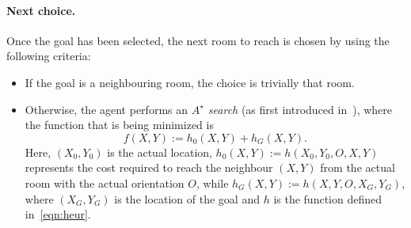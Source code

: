 \documentclass{llncs}
\begin{document}
\paragraph{Next choice.} Once the goal has been selected, the next room to reach is chosen by using the following criteria:
\begin{itemize}
	\item If the goal is a neighbouring room, the choice is trivially that room.
	\item Otherwise, the agent performs an \emph{$A^{\star}$ search} (as first introduced in~\cite{AStar}), where the function that is being minimized is
	$$
	f(X,Y) := h_0(X,Y) + h_G(X,Y).
	$$
	Here, $(X_0,Y_0)$ is the actual location, $h_0(X,Y) := h(X_0,Y_0,O,X,Y)$ represents the cost required to reach the neighbour $(X,Y)$ from the actual room with the actual orientation $O$, while $h_G(X,Y) := h(X,Y,O,X_G,Y_G)$, where $(X_G,Y_G)$ is the location of the goal and $h$ is the function defined in~\ref{eqn:heur}.
\end{itemize}

\end{document}
